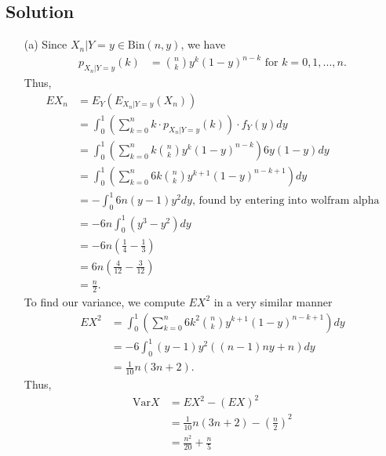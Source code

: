\documentclass[10pt,a4paper]{article}
\theoremstyle{theorem}
\theoremstyle{definition}
\begin{document}
\subsection*{Solution}
\begin{enumerate}
\item[(a)] Since $X_n | Y = y \in \text{Bin}(n, y)$, we have
\begin{align*}
p_{X_n | Y = y}(k) &= {n \choose k} y^k (1 - y)^{n - k} \text{ for } k = 0, 1, ..., n.
\end{align*}
Thus, 
\begin{align*}
EX_n &= E_Y(E_{X_n|Y = y}(X_n))\\
&= \int_0^1 \left( \sum_{k = 0}^n  k \cdot p_{X_n | Y = y}(k)\right) \cdot f_Y(y) dy\\
&= \int_0^1 \left( \sum_{k = 0}^n k {n \choose k} y^k (1 - y)^{n - k} \right) 6y(1 - y) dy\\
&= \int_0^1 \left( \sum_{k = 0}^n  6k {n \choose k}  y^{k+1} (1 - y)^{n - k + 1} \right) dy\\
&= -\int_0^1 6n(y-1)y^2 dy \text{, found by entering into wolfram alpha} \\
&= -6n \int_0^1 (y^3 - y^2) dy\\
&= -6n(\frac{1}{4} - \frac{1}{3})\\
&= 6n(\frac{4}{12} - \frac{3}{12})\\
&= \boxed{\frac{n}{2}}.
\end{align*}
To find our variance, we compute $EX^2$ in a very similar manner
\begin{align*}
EX^2 &= \int_0^1 \left( \sum_{k = 0}^n  6k^2 {n \choose k}  y^{k+1} (1 - y)^{n - k + 1} \right) dy\\ 
&= -6 \int_0^1 (y-1)y^2((n-1)ny + n)dy\\
&= \frac{1}{10}n(3n + 2).
\end{align*}
Thus,
\begin{align*}
\text{Var}X &= EX^2 - (EX)^2\\
&= \frac{1}{10}n(3n + 2) - \left(\frac{n}{2}\right)^2\\
&= \boxed{\frac{n^2}{20} + \frac{n}{5}}
\end{align*}
\end{enumerate}
\end{document}
